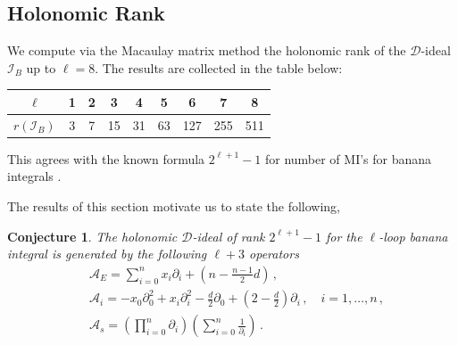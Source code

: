\documentclass[11pt]{article}
\newtheorem{conjecture}{Conjecture}
\begin{document}
\subsection{Holonomic Rank}
We compute via the Macaulay matrix method the holonomic rank of the $\mathcal{D}$-ideal $\mathcal{I}_{B}$ up to $\ell=8$. The results are collected in the table below:
\begin{table}[H]
    \centering
    \begin{tabular}{|c|c|c|c|c|c|c|c|c|}
    \hline
        $\ell$ & 1 & 2 & 3 & 4 & 5 & 6 & 7 & 8 \\ \hline
        $r(\mathcal{I}_{B})$ & 3 & 7 & 15 & 31 & 63 & 127 & 255 & 511 \\
    \hline    
    \end{tabular}
\end{table}
\noindent This agrees with the known formula $2^{\ell+1}-1$ for number of MI's for banana integrals \cite{Bitoun:2017nre}.

The results of this section motivate us to state the following,
\begin{conjecture}
The holonomic $\mathcal{D}$-ideal of rank $2^{\ell+1}-1$ for the $\ell$-loop banana integral is generated by the following $\ell+3$ operators
\begin{align}
&\mathcal{A}_{E} = \sum_{i=0}^{n}x_{i} \partial_{i} + \left(n -\frac{n-1}{2}d \right) \,, \\
&\mathcal{A}_{i} = - x_{0}\partial_{0}^{2} + x_{i} \partial_{i}^{2} -\frac{d}{2} \partial_{0} + \left(2-\frac{d}{2} \right)\partial_{i}    \,, \quad  i=1, \ldots , n \,, \\
&\mathcal{A}_{s} = \left( \prod_{i=0}^{n} \partial_{i} \right) \left( \sum_{i=0}^{n} \frac{1}{\partial_{i}} \right)  \,.
\end{align}
\end{conjecture}




%
%
%
\end{document}
